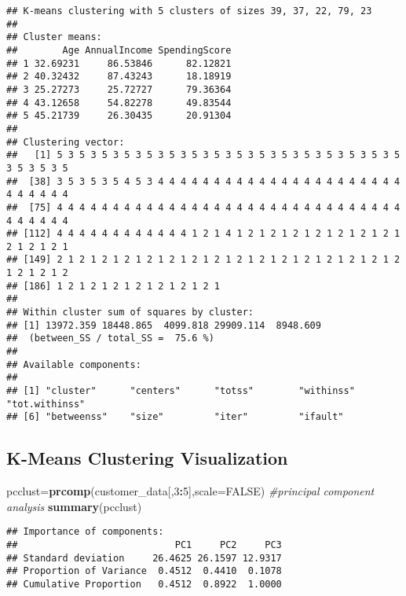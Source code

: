 \documentclass[
]{article}
\newenvironment{Shaded}{\begin{snugshade}}{\end{snugshade}}
\newcommand{\AttributeTok}[1]{\textcolor[rgb]{0.13,0.29,0.53}{#1}}
\newcommand{\CommentTok}[1]{\textcolor[rgb]{0.56,0.35,0.01}{\textit{#1}}}
\newcommand{\ConstantTok}[1]{\textcolor[rgb]{0.56,0.35,0.01}{#1}}
\newcommand{\DecValTok}[1]{\textcolor[rgb]{0.00,0.00,0.81}{#1}}
\newcommand{\FunctionTok}[1]{\textcolor[rgb]{0.13,0.29,0.53}{\textbf{#1}}}
\newcommand{\NormalTok}[1]{#1}
\newcommand{\OtherTok}[1]{\textcolor[rgb]{0.56,0.35,0.01}{#1}}
\newcommand{\SpecialCharTok}[1]{\textcolor[rgb]{0.81,0.36,0.00}{\textbf{#1}}}
\begin{document}
\begin{verbatim}
## K-means clustering with 5 clusters of sizes 39, 37, 22, 79, 23
## 
## Cluster means:
##        Age AnnualIncome SpendingScore
## 1 32.69231     86.53846      82.12821
## 2 40.32432     87.43243      18.18919
## 3 25.27273     25.72727      79.36364
## 4 43.12658     54.82278      49.83544
## 5 45.21739     26.30435      20.91304
## 
## Clustering vector:
##   [1] 5 3 5 3 5 3 5 3 5 3 5 3 5 3 5 3 5 3 5 3 5 3 5 3 5 3 5 3 5 3 5 3 5 3 5 3 5
##  [38] 3 5 3 5 3 5 4 5 3 4 4 4 4 4 4 4 4 4 4 4 4 4 4 4 4 4 4 4 4 4 4 4 4 4 4 4 4
##  [75] 4 4 4 4 4 4 4 4 4 4 4 4 4 4 4 4 4 4 4 4 4 4 4 4 4 4 4 4 4 4 4 4 4 4 4 4 4
## [112] 4 4 4 4 4 4 4 4 4 4 4 4 1 2 1 4 1 2 1 2 1 2 1 2 1 2 1 2 1 2 1 2 1 2 1 2 1
## [149] 2 1 2 1 2 1 2 1 2 1 2 1 2 1 2 1 2 1 2 1 2 1 2 1 2 1 2 1 2 1 2 1 2 1 2 1 2
## [186] 1 2 1 2 1 2 1 2 1 2 1 2 1 2 1
## 
## Within cluster sum of squares by cluster:
## [1] 13972.359 18448.865  4099.818 29909.114  8948.609
##  (between_SS / total_SS =  75.6 %)
## 
## Available components:
## 
## [1] "cluster"      "centers"      "totss"        "withinss"     "tot.withinss"
## [6] "betweenss"    "size"         "iter"         "ifault"
\end{verbatim}

\subsection{K-Means Clustering
Visualization}\label{k-means-clustering-visualization}

\begin{Shaded}
\begin{Highlighting}[]
\NormalTok{pcclust}\OtherTok{=}\FunctionTok{prcomp}\NormalTok{(customer\_data[,}\DecValTok{3}\SpecialCharTok{:}\DecValTok{5}\NormalTok{],}\AttributeTok{scale=}\ConstantTok{FALSE}\NormalTok{) }\CommentTok{\#principal component analysis}
\FunctionTok{summary}\NormalTok{(pcclust)}
\end{Highlighting}
\end{Shaded}

\begin{verbatim}
## Importance of components:
##                            PC1     PC2     PC3
## Standard deviation     26.4625 26.1597 12.9317
## Proportion of Variance  0.4512  0.4410  0.1078
## Cumulative Proportion   0.4512  0.8922  1.0000
\end{verbatim}

\begin{Shaded}
\end{Shaded}
\end{document}
